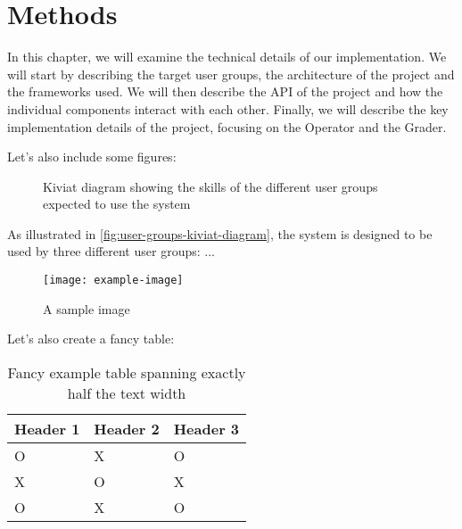 \documentclass[../thesis.tex]{subfiles}
\begin{document}
    \chapter{Methods}\label{ch:methods}
    In this chapter, we will examine the technical details of our implementation. We will start by describing the target user groups, the architecture of the project and the frameworks used. We will then describe the API of the project and how the individual components interact with each other. Finally, we will describe the key implementation details of the project, focusing on the Operator and the Grader.

    Let's also include some figures:

    \begin{figure}[ht!]
        \centering
        \caption{Kiviat diagram showing the skills of the different user groups expected to use the system}
        \label{fig:user-groups-kiviat-diagram}
    \end{figure}
    \FloatBarrier{}

    As illustrated in \autoref{fig:user-groups-kiviat-diagram}, the system is designed to be used by three different user groups: ...
    \begin{figure}[ht!]
        \centering
        \texttt{[image: example-image]}
        \caption{A sample image}
        \label{fig:sample-image}
    \end{figure}

    Let's also create a fancy table:
    \begin{table}[ht]
        \centering
        \begin{tabularx}{.5\textwidth}{|l|l|X|}
            \toprule
            \textbf{\textsf{Header 1}} & \textbf{\textsf{Header 2}} & \textbf{\textsf{Header 3}} \\
            \midrule
            O                          & X                          & O                          \\
            X                          & O                          & X                          \\
            O                          & X                          & O                          \\
            \bottomrule
        \end{tabularx}
        \caption{Fancy example table spanning exactly half the text width}
        \label{tab:example-table}
    \end{table}
\end{document}
